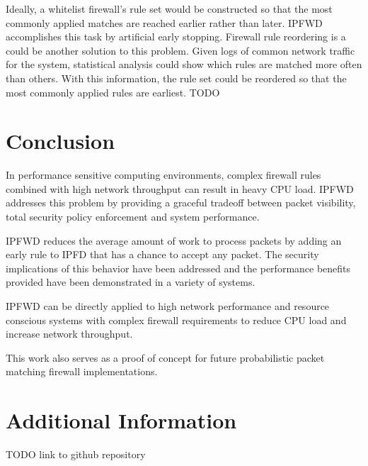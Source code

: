 \documentclass[journal]{IEEEtran}
\begin{document}
  Ideally, a whitelist firewall's rule set would be constructed so that the
  most commonly applied matches are reached earlier rather than later. IPFWD
  accomplishes this task by artificial early stopping. Firewall rule reordering
  is a could be another solution to this problem. Given logs of common network
  traffic for the system, statistical analysis could show which rules are
  matched more often than others. With this information, the rule set could be
  reordered so that the most commonly applied rules are earliest.  TODO




\section{Conclusion}

  In performance sensitive computing environments, complex firewall rules
  combined with high network throughput can result in heavy CPU load. IPFWD
  addresses this problem by providing a graceful tradeoff between packet
  visibility, total security policy enforcement and system performance.

  IPFWD reduces the average amount of work to process packets by adding an
  early rule to IPFD that has a chance to accept any packet. The security
  implications of this behavior have been addressed and the performance
  benefits provided have been demonstrated in a variety of systems.

  IPFWD can be directly applied to high network performance and resource
  conscious systems with complex firewall requirements to reduce CPU load and
  increase network throughput.

  This work also serves as a proof of concept for future probabilistic packet
  matching firewall implementations.

\appendices
\section{Additional Information}
  TODO link to github repository

\end{document}
